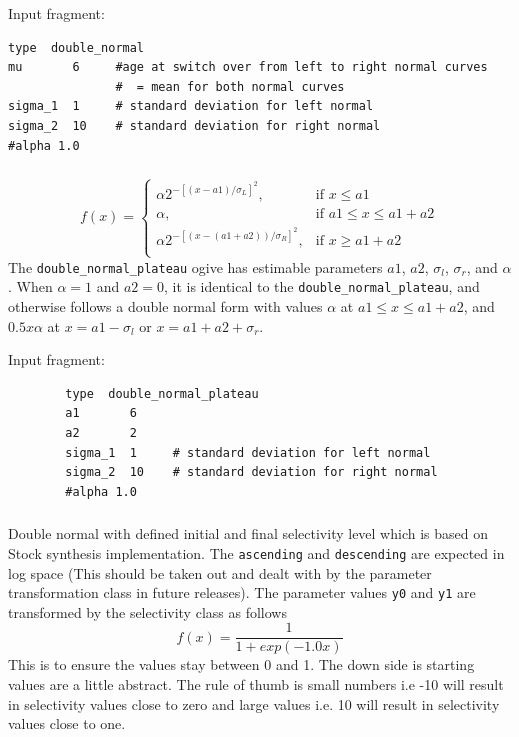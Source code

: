 Input fragment: {\small{\begin{verbatim}
type  double_normal
mu       6     #age at switch over from left to right normal curves
               #  = mean for both normal curves
sigma_1  1     # standard deviation for left normal
sigma_2  10    # standard deviation for right normal
#alpha 1.0
\end{verbatim}}}

\subsubsection[Double-normal-plateau]{}\label{sec:Selectivity-DoubleNormalPlateau}

\begin{equation}
f(x) = \begin{cases}
\alpha 2^{-[(x- a1)/\sigma_L ]^2}, & \text{if $x \leq a1$} \\
\alpha, 							& \text{if $a1 \le x \leq a1 + a2 $}\\
\alpha 2^{-[(x- (a1 + a2))/\sigma_R ]^2}, & \text{if $x \ge a1 + a2 $}\\
\end{cases}
\end{equation}
The \texttt{double\_normal\_plateau} ogive has estimable parameters \(a1\), \(a2\), \(\sigma_l\), \(\sigma_r\), and \(\alpha\). When \(\alpha = 1\) and \(a2 = 0\), it is identical to the \texttt{double\_normal\_plateau}, and otherwise follows a double normal form with values \(\alpha\) at \(a1 \le x \leq a1+a2\), and \(0.5 x \alpha\) at \(x= a1-\sigma_l\) or \(x=a1+a2+\sigma_r\).

Input fragment: {\small{\begin{verbatim}
		type  double_normal_plateau
		a1       6    
		a2 	     2
		sigma_1  1     # standard deviation for left normal
		sigma_2  10    # standard deviation for right normal
		#alpha 1.0
		\end{verbatim}}}



\subsubsection[Double-normal-stocksynthesis]{}\label{sec:Selectivity-DoubleNormalStockSynthesis}
Double normal with defined initial and final selectivity level which is based on Stock synthesis implementation. The \texttt{ascending} and \texttt{descending} are expected in log space (This should be taken out and dealt with by the parameter transformation class in future releases). The parameter values \texttt{y0} and \texttt{y1} are transformed by the selectivity class as follows
\[
f(x) = \frac{1}{1+exp(-1.0 x )}
\] 
This is to ensure the values stay between 0 and 1. The down side is starting values are a little abstract. The rule of thumb is small numbers i.e -10 will result in selectivity values close to zero and large values i.e. 10 will result in selectivity values close to one.


